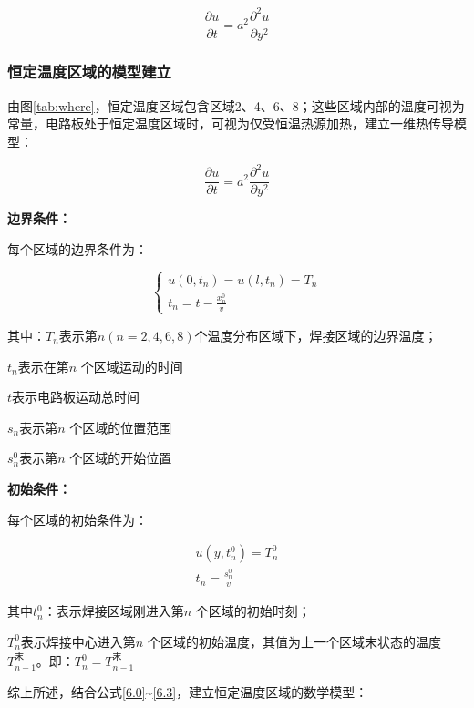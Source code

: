 \documentclass[withoutpreface,bwprint]{cumcmthesis} %
\numberwithin{equation}{subsection}
\begin{document}
\begin{equation}
	\frac{\partial u}{\partial t}=a^{2} \frac{\partial^{2} u}{\partial y^{2}}
	\label{6.0}
\end{equation}
\subsubsection{恒定温度区域的模型建立}

由图\ref{tab:where}，恒定温度区域包含区域2、4、6、8；这些区域内部的温度可视为常量，电路板处于恒定温度区域时，可视为仅受恒温热源加热，建立一维热传导模型：

$$\frac{\partial u}{\partial t}= a^2\frac{\partial^2 u}{\partial y^2}$$


\noindent \textbf{边界条件：}

每个区域的边界条件为\cite{lishan2020}：

\begin{equation}
	\left\{\begin{array}{l}
		u\left(0, t_{n}\right)=u\left(l, t_{n}\right)=T_{n} \\
		t_{n}=t-\frac{x_{n}^{0}}{v}
	\end{array}\right.
	\label{6.2}
\end{equation}

\noindent 其中：$T_{n}$表示第$n (𝑛 =2,4,6,8)$个温度分布区域下，焊接区域的边界温度；

$t_{n}$表示在第$n$ 个区域运动的时间

$t$表示电路板运动总时间


$s_{n}$表示第$n$ 个区域的位置范围

$s_{n}^0$表示第$n$ 个区域的开始位置

\noindent \textbf{初始条件：}

每个区域的初始条件为：

\begin{equation}
	\begin{array}{c}
	u\left(y,t_{n}^0 \right) =T_{n}^0 \\
	t_{n}=\frac{s_{n}^0}{v}
	\end{array}
		\label{6.3}
\end{equation}

\noindent 其中$t_{n}^0$：表示焊接区域刚进入第$n$ 个区域的初始时刻；

$T_{n}^0$表示焊接中心进入第$n$ 个区域的初始温度，其值为上一个区域末状态的温度$T_{n-1}^\text{末}$。即：$T_{n}^0=T_{n-1}^\text{末}$

综上所述，结合公式\eqref{6.0}\~{}\eqref{6.3}，建立恒定温度区域的数学模型\cite{liuhaiyang2013latex}：
\end{document}
